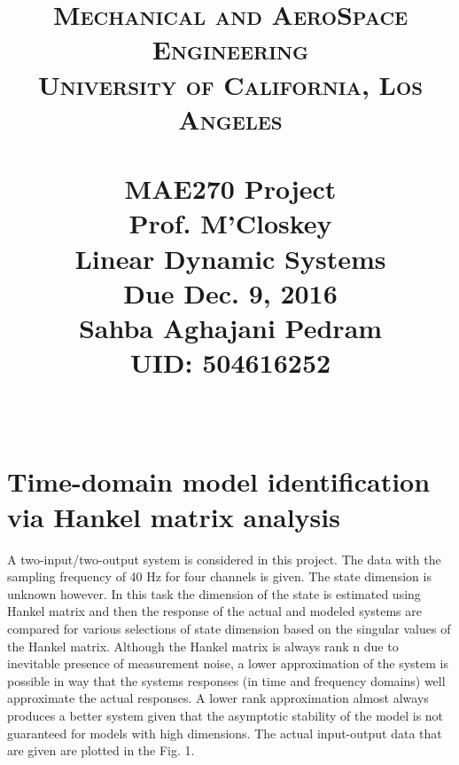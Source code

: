 \documentclass[paper=US leter, fontsize=11pt]{scrartcl}
\title{
		\usefont{OT1}{bch}{b}{n}
		\normalfont \normalsize \textsc{Mechanical and AeroSpace Engineering\\University of California, Los Angeles} \\ [25pt]
		\vspace{140pt}
		\horrule{0.5pt} \\[0.4cm]
		\huge MAE270 Project \\
		Prof. M'Closkey \\
		Linear Dynamic Systems \\
		Due Dec. 9, 2016 \\
		\vspace{20pt}
		Sahba Aghajani Pedram\\
		UID: 504616252
 \\
		\horrule{2pt} \\[0.5cm]
}
\date{}
\begin{document}
	\newpage
\maketitle

\vspace{-40pt}
\newpage
\section{Time-domain model identification via Hankel matrix analysis}
A two-input/two-output system is considered in this project. The data with the sampling frequency of 40 Hz for four channels is given. The state dimension is unknown however. In this task the dimension of the state is estimated using Hankel matrix and then the response of the actual and modeled systems are compared for various selections of state dimension based on the singular values of the Hankel matrix. Although the Hankel matrix is always rank n due to inevitable presence of measurement noise, a lower approximation of the system is possible in way that the systems responses (in time and frequency domains) well approximate the actual responses. A lower rank approximation almost always produces a better system given that the asymptotic stability of the model is not guaranteed for models with high dimensions. 
The actual input-output data that are given are plotted in the Fig. 1.\\
	
\end{document}
